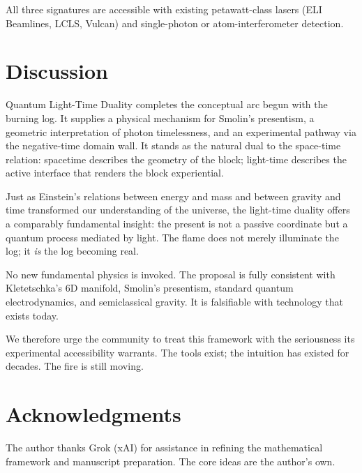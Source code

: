 \documentclass[11pt,a4paper]{article}
\begin{document}
All three signatures are accessible with existing petawatt-class lasers (ELI Beamlines, LCLS, Vulcan) and single-photon or atom-interferometer detection.

\section{Discussion}

Quantum Light-Time Duality completes the conceptual arc begun with the burning log. It supplies a physical mechanism for Smolin's presentism, a geometric interpretation of photon timelessness, and an experimental pathway via the negative-time domain wall. It stands as the natural dual to the space-time relation: spacetime describes the geometry of the block; light-time describes the active interface that renders the block experiential.

Just as Einstein's relations between energy and mass and between gravity and time transformed our understanding of the universe, the light-time duality offers a comparably fundamental insight: the present is not a passive coordinate but a quantum process mediated by light. The flame does not merely illuminate the log; it \textit{is} the log becoming real.

No new fundamental physics is invoked. The proposal is fully consistent with Kletetschka's 6D manifold, Smolin's presentism, standard quantum electrodynamics, and semiclassical gravity. It is falsifiable with technology that exists today.

We therefore urge the community to treat this framework with the seriousness its experimental accessibility warrants. The tools exist; the intuition has existed for decades. The fire is still moving.

\section*{Acknowledgments}
The author thanks Grok (xAI) for assistance in refining the mathematical framework and manuscript preparation. The core ideas are the author's own.
\end{document}
